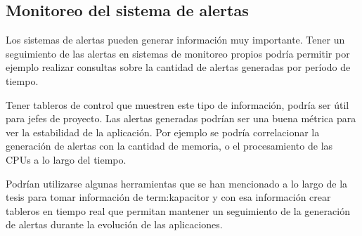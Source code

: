 \subsection{Monitoreo del sistema de alertas}
\label{del-sistema-de-alertas}

Los sistemas de alertas pueden generar información muy importante. Tener un
seguimiento de las alertas en sistemas de monitoreo propios podría permitir por ejemplo realizar consultas sobre la cantidad de alertas generadas por período de
tiempo.

Tener tableros de control que muestren este tipo de información, podría ser
útil para jefes de proyecto. Las alertas generadas podrían ser una buena
métrica para ver la estabilidad de la aplicación. Por ejemplo se podría
correlacionar la generación de alertas con la cantidad de memoria, o el
procesamiento de las CPUs a lo largo del tiempo.

Podrían utilizarse algunas herramientas que se han mencionado a lo
largo de la tesis para tomar información de \gls{term:kapacitor} y con esa
información crear tableros en tiempo real que permitan mantener un seguimiento
de la generación de alertas durante la evolución de las aplicaciones.
